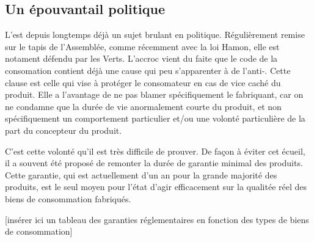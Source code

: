 \subsection{Un épouvantail politique}
L'\op est depuis longtemps déjà un sujet brulant en politique. Régulièrement remise sur le tapis de l'Assemblée, comme récemment avec la loi Hamon, elle est notament défendu par les Verts.
\smallbreak L'accroc vient du faite que le code de la consomation contient déjà une cause qui peu s'apparenter à de l'anti-\op.
Cette clause est celle qui vise à protéger le consomateur en cas de vice caché du produit. Elle a l'avantage de ne pas blamer spécifiquement le fabriquant, car on ne condamne que la durée de vie anormalement courte du produit, et non spécifiquement un comportement particulier et/ou une volonté particulière de la part du concepteur du produit.

\smallbreak C'est cette volonté qu'il est très difficile de prouver. De façon à éviter cet écueil, il a souvent été proposé de remonter la durée de garantie minimal des produits. Cette garantie, qui est actuellement d'un an pour la grande majorité des produits, est le seul moyen pour l'état d'agir efficacement sur la qualitée réel des biens de consommation fabriqués.



[insérer ici un tableau des garanties réglementaires en fonction des types de biens de consommation]

